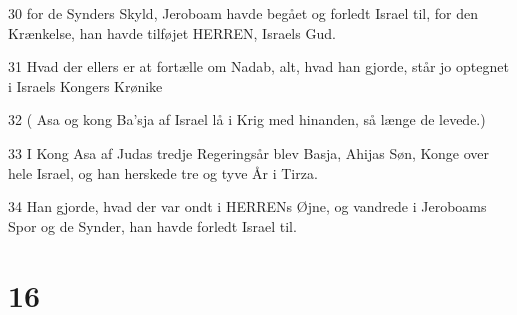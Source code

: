 \par 30 for de Synders Skyld, Jeroboam havde begået og forledt Israel til, for den Krænkelse, han havde tilføjet HERREN, Israels Gud.
\par 31 Hvad der ellers er at fortælle om Nadab, alt, hvad han gjorde, står jo optegnet i Israels Kongers Krønike
\par 32 ( Asa og kong Ba'sja af Israel lå i Krig med hinanden, så længe de levede.)
\par 33 I Kong Asa af Judas tredje Regeringsår blev Basja, Ahijas Søn, Konge over hele Israel, og han herskede tre og tyve År i Tirza.
\par 34 Han gjorde, hvad der var ondt i HERRENs Øjne, og vandrede i Jeroboams Spor og de Synder, han havde forledt Israel til.

\chapter{16}

